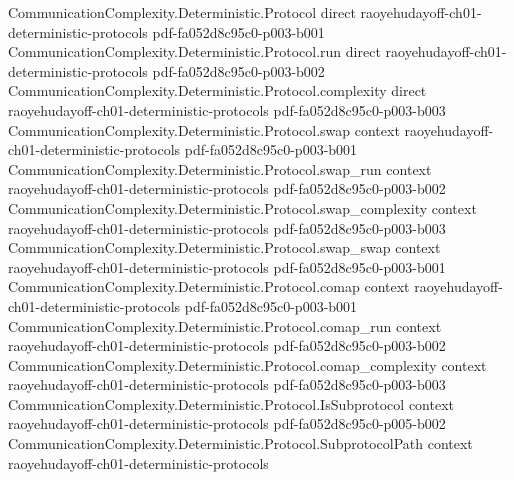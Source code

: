 \begin{lemma}
\label{CommunicationComplexity.Deterministic.Protocol.aux_disjoint}
\leanok
{}
\proofstep
  {CommunicationComplexity.Deterministic.Protocol}
  {direct}
  {raoyehudayoff-ch01-deterministic-protocols}
  {pdf-fa052d8c95c0-p003-b001}
\proofstep
  {CommunicationComplexity.Deterministic.Protocol.run}
  {direct}
  {raoyehudayoff-ch01-deterministic-protocols}
  {pdf-fa052d8c95c0-p003-b002}
\proofstep
  {CommunicationComplexity.Deterministic.Protocol.complexity}
  {direct}
  {raoyehudayoff-ch01-deterministic-protocols}
  {pdf-fa052d8c95c0-p003-b003}
\proofstep
  {CommunicationComplexity.Deterministic.Protocol.swap}
  {context}
  {raoyehudayoff-ch01-deterministic-protocols}
  {pdf-fa052d8c95c0-p003-b001}
\proofstep
  {CommunicationComplexity.Deterministic.Protocol.swap_run}
  {context}
  {raoyehudayoff-ch01-deterministic-protocols}
  {pdf-fa052d8c95c0-p003-b002}
\proofstep
  {CommunicationComplexity.Deterministic.Protocol.swap_complexity}
  {context}
  {raoyehudayoff-ch01-deterministic-protocols}
  {pdf-fa052d8c95c0-p003-b003}
\proofstep
  {CommunicationComplexity.Deterministic.Protocol.swap_swap}
  {context}
  {raoyehudayoff-ch01-deterministic-protocols}
  {pdf-fa052d8c95c0-p003-b001}
\proofstep
  {CommunicationComplexity.Deterministic.Protocol.comap}
  {context}
  {raoyehudayoff-ch01-deterministic-protocols}
  {pdf-fa052d8c95c0-p003-b001}
\proofstep
  {CommunicationComplexity.Deterministic.Protocol.comap_run}
  {context}
  {raoyehudayoff-ch01-deterministic-protocols}
  {pdf-fa052d8c95c0-p003-b002}
\proofstep
  {CommunicationComplexity.Deterministic.Protocol.comap_complexity}
  {context}
  {raoyehudayoff-ch01-deterministic-protocols}
  {pdf-fa052d8c95c0-p003-b003}
\proofstep
  {CommunicationComplexity.Deterministic.Protocol.IsSubprotocol}
  {context}
  {raoyehudayoff-ch01-deterministic-protocols}
  {pdf-fa052d8c95c0-p005-b002}
\proofstep
  {CommunicationComplexity.Deterministic.Protocol.SubprotocolPath}
  {context}
  {raoyehudayoff-ch01-deterministic-protocols}

\end{lemma}
